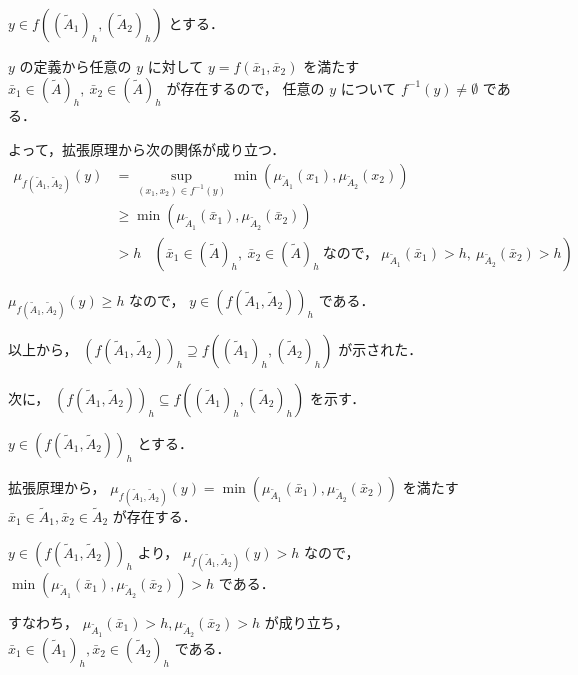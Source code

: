 \documentclass[uplatex, a4j, 10pt, fleqn, dvipdfmx]{article}
\begin{document}
\noindent
$y \in f \left( ( \tilde{A}_1 )_h, ( \tilde{A}_2 )_h \right)$ とする．

\noindent
$y$ の定義から任意の $y$ に対して $y = f \left( \bar{x}_1, \bar{x}_2 \right)$ を満たす
$\bar{x}_1 \in ( \tilde{A} )_h, ~ \bar{x}_2 \in ( \tilde{A} )_h$ が存在するので，
任意の $y$ について $f^{-1}(y) \neq \emptyset$ である．

\noindent
よって，拡張原理から次の関係が成り立つ．
\begin{align}
	\mu_{f \left( \tilde{A}_1, \tilde{A}_2 \right)}(y)
	 & = \sup_{\left( x_1, x_2 \right) \in f^{-1}(y)} \min \left( \mu_{\tilde{A}_1}(x_1), \mu_{\tilde{A}_2}(x_2) \right)
	\\
	 & \geq \min \left( \mu_{\tilde{A}_1}(\bar{x}_1), \mu_{\tilde{A}_2}(\bar{x}_2) \right)
	\\
	 & > h ~~~~
	\left( \bar{x}_1 \in ( \tilde{A} )_h, ~ \bar{x}_2 \in ( \tilde{A} )_h ~ \text{なので，} ~ \mu_{\tilde{A}_1}(\bar{x}_1) > h, ~ \mu_{\tilde{A}_2}(\bar{x}_2) > h \right)
\end{align}

\noindent
$\mu_{f \left( \tilde{A}_1, \tilde{A}_2 \right)}(y) \geq h$ なので， $y \in \left( f \left( \tilde{A}_1, \tilde{A}_2 \right) \right)_h$ である．

\noindent
以上から， $\left( f \left( \tilde{A}_1, \tilde{A}_2 \right) \right)_h \supseteq
	f \left( ( \tilde{A}_1 )_h, ( \tilde{A}_2 )_h \right)$ が示された．

\noindent
次に， $\left( f \left( \tilde{A}_1, \tilde{A}_2 \right) \right)_h \subseteq
	f \left( ( \tilde{A}_1 )_h, ( \tilde{A}_2 )_h \right)$ を示す．

\noindent
$y \in \left( f \left( \tilde{A}_1, \tilde{A}_2 \right) \right)_h$ とする．

\noindent
拡張原理から， $\mu_{f\left( \tilde{A}_1, \tilde{A}_2 \right)}(y) = \min \left( \mu_{\tilde{A}_1}(\bar{x}_1), \mu_{\tilde{A}_2}(\bar{x}_2) \right)$
を満たす $\bar{x}_1 \in \tilde{A}_1, \bar{x}_2 \in \tilde{A}_2$ が存在する．


\noindent
$y \in \left( f \left( \tilde{A}_1, \tilde{A}_2 \right) \right)_h$ より， $\mu_{f\left( \tilde{A}_1, \tilde{A}_2 \right)}(y) > h$ なので，
$\min \left( \mu_{\tilde{A}_1}(\bar{x}_1), \mu_{\tilde{A}_2}(\bar{x}_2) \right) > h$ である．

\noindent
すなわち， $\mu_{\tilde{A}_1}(\bar{x}_1) > h, \mu_{\tilde{A}_2}(\bar{x}_2) > h$ が成り立ち，
$\bar{x}_1 \in ( \tilde{A}_1 )_h, \bar{x}_2 \in ( \tilde{A}_2 )_h$ である．
\end{document}
